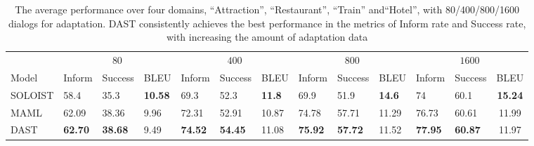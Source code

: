 \documentclass[letterpaper]{article}
\begin{document}
\begin{table}[ht]
\centering
\setlength{\extrarowheight}{0.08cm}
\small
\begin{adjustbox}{width=0.89\columnwidth}
\begin{tabular}[width=\textwidth]{lC{0.75cm}C{0.75cm}C{0.75cm}C{0.75cm}C{0.75cm}C{0.75cm}C{0.75cm}C{0.75cm}C{0.75cm}C{0.75cm}C{0.75cm}c}
\toprule
\hline
&  &  &  &  \\
\cmidrule(lr){2-4} \cmidrule(lr){5-7} \cmidrule(lr){8-10} \cmidrule(lr){11-13}
Model   & Inform    & Success   & BLEU   & Inform    & Success   & BLEU   & Inform  & Success  & BLEU & Inform  & Success  & BLEU \\
\midrule
SOLOIST                      & 58.4                 & 35.3                 & \textbf{10.58}                & 69.3                 & 52.3                 & \textbf{11.8}                 & 69.9                 & 51.9                 & \textbf{14.6}                 & 74                   & 60.1                 & \textbf{15.24}                \\
MAML                         & 62.09                & 38.36                & 9.96                     & 72.31                & 52.91                & 10.87                      & 74.78                & 57.71                & 11.29                      & 76.73                & 60.61                & 11.99                      \\
DAST                          & \textbf{62.70}                & \textbf{38.68}                & 9.49                & \textbf{74.52}                & \textbf{54.45}                & 11.08                     & \textbf{75.92}                & \textbf{57.72}                & 11.52                      & \textbf{77.95}                & \textbf{60.87}                & 11.97                     \\
\bottomrule
\end{tabular}
\end{adjustbox}
\caption{The average performance over four domains, ``Attraction'', ``Restaurant'', ``Train'' and``Hotel'', with 80/400/800/1600 dialogs for adaptation. DAST consistently achieves the best performance in the metrics of Inform rate and Success rate, with increasing the amount of adaptation data
}
\label{multiwoz_increase_adapt_size}
\end{table}
\end{document}
